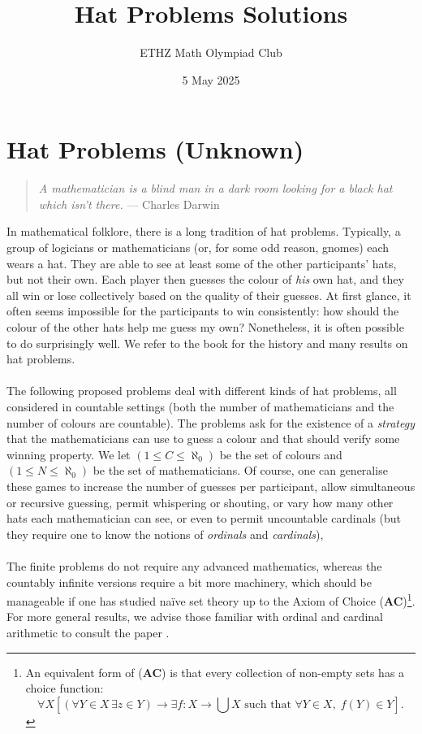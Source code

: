 \documentclass[11pt, a4paper, oneside]{article}
\title{Hat Problems Solutions}
\author{ETHZ Math Olympiad Club}
\date{5 May 2025}
\newcommand{\problem}[1][]{\section{#1} \hfill \par}
\theoremstyle{remark}
\theoremstyle{lemma}
\begin{document}
\maketitle
\problem[Hat Problems (Unknown)]
\begin{quote}
\textit{A mathematician is a blind man in a dark room looking for a black hat which isn’t there.}
\hfill — Charles Darwin
\end{quote}
In mathematical folklore, there is a long tradition of hat problems. Typically, a group of logicians or mathematicians (or, for some odd reason, gnomes) each wears a hat. They are able to see at least some of the other participants' hats, but not their own. Each player then guesses the colour of \textit{his} own hat, and they all win or lose collectively based on the quality of their guesses. At first glance, it often seems impossible for the participants to win consistently: how should the colour of the other hats help me guess my own? Nonetheless, it is often possible to do surprisingly well. We refer to the book \cite{hardin2013mathematics} for the history and many results on hat problems.
\\\\
The following proposed problems deal with different kinds of hat problems, all considered in countable settings (both the number of mathematicians and the number of colours are countable). The problems ask for the existence of a \textit{strategy} that the mathematicians can use to guess a colour and that should verify some winning property. We let \( \left(1 \leq C \leq \aleph_0\right) \) be the set of colours and \( \left(1 \leq N \leq \aleph_0\right) \) be the set of mathematicians. Of course, one can generalise these games to increase the number of guesses per participant, allow simultaneous or recursive guessing, permit whispering or shouting, or vary how many other hats each mathematician can see, or even to permit uncountable cardinals (but they require one to know the notions of \textit{ordinals} and \textit{cardinals}),
\\\\
The finite problems do not require any advanced mathematics, whereas the countably infinite versions require a bit more machinery, which should be manageable if one has studied naïve set theory up to the Axiom of Choice (\textbf{AC})\footnote{An equivalent form of (\textbf{AC}) is that every collection of non-empty sets has a choice function:
\[
\forall X \left[\left(\forall Y \in X\, \exists z \in Y\right) \to \exists f: X \to \bigcup X \text{ such that } \forall Y \in X,\; f\left(Y\right) \in Y\right].
\]}. For more general results, we advise those familiar with ordinal and cardinal arithmetic to consult the paper \cite{lietz2024infinite}.
\end{document}
